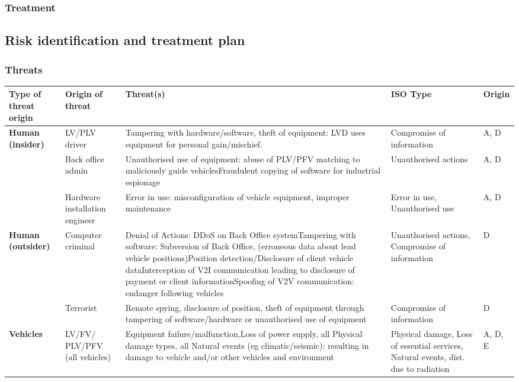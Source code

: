\documentclass[british,11pt,a4paper]{article}
\begin{document}
\subsubsection{Treatment}

\subsection{Risk identification and treatment plan}

\subsubsection{Threats}
\begin{table}[]
\begin{tabular}{|p{2cm}|p{2cm}|p{6cm}|p{3cm}|p{1.5cm}|}
\hline
\textbf{Type of threat origin} & \textbf{Origin of threat} & \textbf{Threat(s)} & \textbf{ISO Type} & \textbf{Origin} \\ \hline
\multirow{3}{2cm}{\textbf{Human (insider)}} & LV/PLV driver & Tampering with hardware/software, theft of equipment: LVD uses equipment for personal gain/mischief. & Compromise of information & A, D \\ \cline{2-5} 
 & Back office admin & Unauthorised use of equipment: abuse of PLV/PFV matching to maliciously guide vehiclesFraudulent copying of software for industrial espionage & Unauthorised actions & A, D \\ \cline{2-5} 
 & Hardware installation engineer & Error in use: misconfiguration of vehicle equipment, improper maintenance & Error in use, Unauthorised use & A, D \\ \hline
\multirow{2}{2cm}{\textbf{Human (outsider)}} & Computer criminal & Denial of Actions: DDoS on Back Office systemTampering with software: Subversion of Back Office, (erroneous data about lead vehicle positions)Position detection/Disclosure of client vehicle dataInterception of V2I communication leading to disclosure of payment or client informationSpoofing of V2V communication: endanger following vehicles & Unauthorised actions, Compromise of information & D \\ \cline{2-5} 
 & Terrorist & Remote spying, disclosure of position, theft of equipment through tampering of software/hardware or unauthorised use of equipment & Compromise of information & D \\ \hline
\textbf{Vehicles} & LV/FV/ PLV/PFV (all vehicles) & Equipment failure/malfunction,Loss of power supply, all Physical damage types, all Natural events (eg climatic/seismic): resulting in damage to vehicle and/or other vehicles and environment & Physical damage, Loss of essential services, Natural events, dist. due to radiation & A, D, E \\ \hline

\end{tabular}
\end{table}
\end{document}
